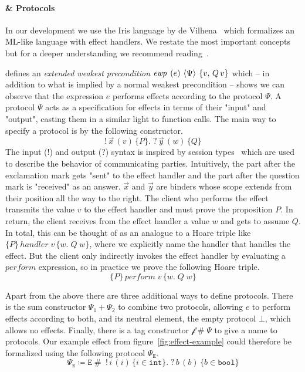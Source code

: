 \paragraph{\hazel{} \& Protocols}
In our development we use the Iris language \hazel{} by de Vilhena~\cite{de2021separation,de2022proof} which formalizes an ML-like language with effect handlers.
We restate the most important concepts but for a deeper understanding we recommend reading~\cite{de2021separation}.

\hazel{} defines an \emph{extended weakest precondition} \(\ewp{e}{\Psi}{v,\, Q\, v}\) which -- in addition to what is implied by a normal weakest precondition --
shows we can observe that the expression \(e\) performs effects according to the protocol \(\Psi\).
A protocol \(\Psi\) acts as a specification for effects in terms of their "input" and "output", casting them in a similar light to function calls.
The main way to specify a protocol is by the following constructor.
\[
    !\, \overrightarrow{x}\, (v)\, \{P\}.\; ?\, \overrightarrow{y}\, (w)\, \{Q\}
\]
The input (!) and output (?) syntax is inspired by session types~\cite{sestypes} which are used to describe the behavior of communicating parties.
Intuitively, the part after the exclamation mark gets "sent" to the effect handler and the part after the question mark is "received" as an answer.
\(\overrightarrow{x}\) and \(\overrightarrow{y}\) are binders whose scope extends from their position all the way to the right.
The client who performs the effect transmits the value \(v\) to the effect handler and must prove the proposition \(P\).
In return, the client receives from the effect handler a value \(w\) and gets to assume \(Q\).
In total, this can be thought of as an analogue to a Hoare triple like \(\{P\}\, handler\; v\, \{w.\; Q\; w\}\), where we explicitly name the handler that handles the effect.
But the client only indirectly invokes the effect handler by evaluating a \(perform\) expression, so in practice we prove the following Hoare triple.
\[
    \{P\}\, perform\; v\, \{w.\; Q\; w\}
\]

Apart from the above there are three additional ways to define protocols.
There is the sum constructor \(\Psi_1 + \Psi_2\) to combine two protocols, allowing \(e\) to perform effects according to both, and its neutral element, the empty protocol \(\bot\),
which allows no effects.
Finally, there is a tag constructor \(\mathcal{f} \mathop{\#} \Psi\) to give a name to protocols.
Our example effect  from figure~\ref{fig:effect-example} could therefore be formalized using the following protocol \(\Psi_\mathtt{E}\).
\[
    \Psi_\mathtt{E} \coloneq \mathtt{E} \mathop{\#}\; !\, i\, (i)\, \{ i \in \mathtt{int} \}.\; ?\, b\, (b)\, \{ b \in \mathtt{bool} \}
\]

